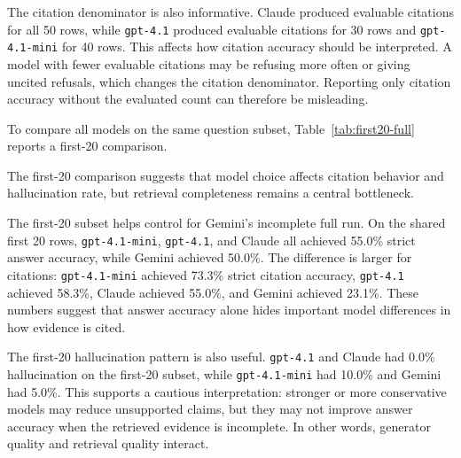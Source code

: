 \documentclass[10pt,twocolumn]{article}
\begin{document}
\begin{table}[!htbp]
\centering
\scriptsize
\setlength{\tabcolsep}{3pt}
\caption{Full available cross-model metrics with partial-credit scores and citation denominators.}
\label{tab:cross-model-full}
\end{table}

The citation denominator is also informative. Claude produced evaluable citations for all 50 rows, while \texttt{gpt-4.1} produced evaluable citations for 30 rows and \texttt{gpt-4.1-mini} for 40 rows. This affects how citation accuracy should be interpreted. A model with fewer evaluable citations may be refusing more often or giving uncited refusals, which changes the citation denominator. Reporting only citation accuracy without the evaluated count can therefore be misleading.

To compare all models on the same question subset, Table~\ref{tab:first20-full} reports a first-20 comparison.

The first-20 comparison suggests that model choice affects citation behavior and hallucination rate, but retrieval completeness remains a central bottleneck.

The first-20 subset helps control for Gemini's incomplete full run. On the shared first 20 rows, \texttt{gpt-4.1-mini}, \texttt{gpt-4.1}, and Claude all achieved 55.0\% strict answer accuracy, while Gemini achieved 50.0\%. The difference is larger for citations: \texttt{gpt-4.1-mini} achieved 73.3\% strict citation accuracy, \texttt{gpt-4.1} achieved 58.3\%, Claude achieved 55.0\%, and Gemini achieved 23.1\%. These numbers suggest that answer accuracy alone hides important model differences in how evidence is cited.

The first-20 hallucination pattern is also useful. \texttt{gpt-4.1} and Claude had 0.0\% hallucination on the first-20 subset, while \texttt{gpt-4.1-mini} had 10.0\% and Gemini had 5.0\%. This supports a cautious interpretation: stronger or more conservative models may reduce unsupported claims, but they may not improve answer accuracy when the retrieved evidence is incomplete. In other words, generator quality and retrieval quality interact.
\end{document}
